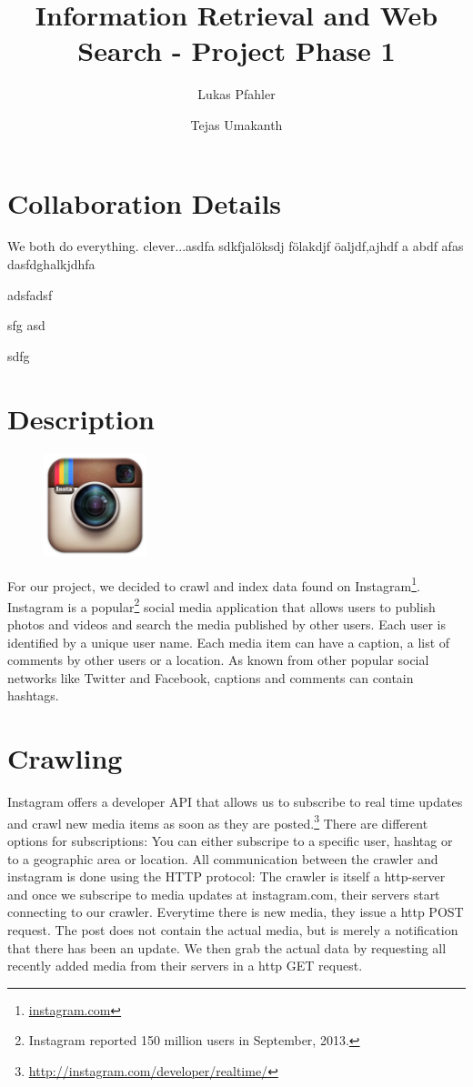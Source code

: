 \documentclass[11pt]{article}
\title{Information Retrieval and Web Search - Project Phase 1}
\author{Lukas Pfahler \and Tejas Umakanth}
\begin{document}
\maketitle
\section{Collaboration Details}
	We both do everything. clever...asdfa sdkfjalöksdj fölakdjf öaljdf,ajhdf a abdf afas
	dasfdghalkjdhfa


	adsfadsf

	sfg
	asd

	sdfg
\section{Description}
	\begin{figure}
  		\vspace{-0.6cm}
  		\includegraphics[width=3cm,height=3cm]{logo.png}
	\end{figure}
	For our project, we decided to crawl and index data found on Instagram\footnote{\url{instagram.com}}. Instagram is a popular\footnote{Instagram reported 150 million users in September, 2013.} social media application that allows users to publish photos and videos and search the media published by other users. Each user is identified by a unique user name. Each media item can have a caption, a list of comments by other users or a location. As known from other popular social networks like Twitter and Facebook, captions and comments can contain hashtags.
\section{Crawling}
	Instagram offers a developer API that allows us to subscribe to real time updates and crawl new media items as soon as they are posted.\footnote{\url{http://instagram.com/developer/realtime/}} There are different options for subscriptions: You can either subscripe to a specific user, hashtag or to a geographic area or location. All communication between the crawler and instagram is done using the HTTP protocol: The crawler is itself a http-server and once we subscripe to media updates at instagram.com, their servers start connecting to our crawler. Everytime there is new media, they issue a http POST request. The post does not contain the actual media, but is merely a notification that there has been an update. We then grab the actual data by requesting all recently added media from their servers in a http GET request.
\end{document}
